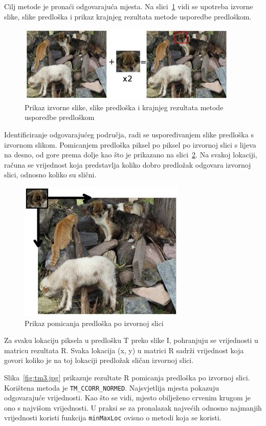 Cilj metode je pronaći odgovarajuća mjesta. Na
slici~\ref{fig:tm1.jpg} vidi se upotreba izvorne slike, slike predloška
i prikaz krajnjeg rezultata metode usporedbe predloškom.

\begin{figure}[h]
\centering
\includegraphics[scale=1]{figures/tm1.jpg}
\caption{Prikaz izvorne slike, slike predloška i krajnjeg rezultata
metode usporedbe predloškom}
\label{fig:tm1.jpg}
\end{figure}

Identificiranje odgovarajućeg područja, radi se uspoređivanjem slike
predloška s izvornom slikom. Pomicanjem predloška piksel po piksel po
izvornoj slici s lijeva na desno, od gore prema dolje kao što je
prikazano na slici~\ref{fig:tm2.jpg}. Na svakoj lokaciji, računa se
vrijednost koja predstavlja koliko dobro predložak odgovara izvornoj
slici, odnosno koliko su slični.

\begin{figure}[h]
\centering
\includegraphics[scale=0.5]{figures/tm2.jpg}
\caption{Prikaz pomicanja predloška po izvornoj slici}
\label{fig:tm2.jpg}
\end{figure}

Za svaku lokaciju piksela u predlošku T preko slike I, pohranjuju se
vrijednosti u matricu rezultata R. Svaka lokacija (x, y) u matrici R
sadrži vrijednost koja govori koliko je na toj lokaciji predložak
sličan izvornoj slici. 

Slika~\ref{fig:tm3.jpg} prikazuje rezultate R pomicanja predloška po
izvornoj slici. Korištena metoda je \texttt{TM\_CCORR\_NORMED}.
Najsvjetlija mjesta pokazuju odgovarajuće vrijednosti. Kao što se vidi,
mjesto obilježeno crvenim krugom je ono s najvišom vrijednosti. U praksi
se za pronalazak najvećih odnosno najmanjih vrijednosti koristi funkcija
\texttt{minMaxLoc} ovisno o metodi koja se koristi.


